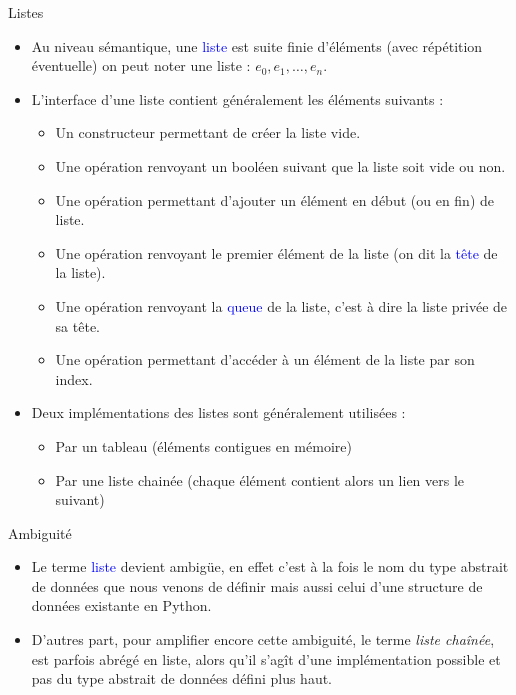 \documentclass[10pt]{beamer}
\begin{document}
\begin{frame}{\SL}
	\mframe{\SL}
	\begin{alertblock}{Listes}
		\begin{itemize}
			\item<1-> Au niveau sémantique, une \textcolor{blue}{liste} est suite finie d'éléments (avec répétition éventuelle) on peut noter une liste : $e_0, e_1, \dots, e_n$.
			\item<2-> L'interface d'une liste contient généralement les éléments suivants :
			      \begin{itemize}
				      \item<3-> Un constructeur permettant de créer la liste vide.
				      \item<4-> Une opération renvoyant un booléen suivant que la liste soit vide ou non.
				      \item<5-> Une opération permettant d'ajouter un élément en début (ou en fin) de liste.
				      \item<6-> Une opération renvoyant le premier élément de la liste (on dit la \textcolor{blue}{tête} de la liste).
				      \item<7-> Une opération renvoyant la \textcolor{blue}{queue} de la liste, c'est à dire la liste privée de sa tête.
				      \item<8-> Une opération permettant d'accéder à un élément de la liste par son index.
			      \end{itemize}
			\item<9-> Deux implémentations des listes sont généralement utilisées :
			      \begin{itemize}
				      \item<10-> Par un tableau (éléments contigues en mémoire)
				      \item<11-> Par une liste chainée (chaque élément contient alors un lien vers le suivant)
			      \end{itemize}
		\end{itemize}
	\end{alertblock}
\end{frame}

\begin{frame}{\SL}
	\mframe{\SL}
	\begin{block}{\textcolor{yellow}{\danger} \; Ambiguité}
		\begin{itemize}
			\item<1-> Le terme \textcolor{blue}{liste} devient ambigüe, en effet c'est à la fois le nom du type abstrait de données que nous venons de définir mais aussi celui d'une structure de données existante en Python.
			\item<2-> D'autres part, pour amplifier encore cette ambiguité, le terme \textit{liste chaînée}, est parfois abrégé en liste, alors qu'il s'agît d'une implémentation possible et pas du type abstrait de données défini plus haut.
		\end{itemize}
	\end{block}
\end{frame}
\end{document}
